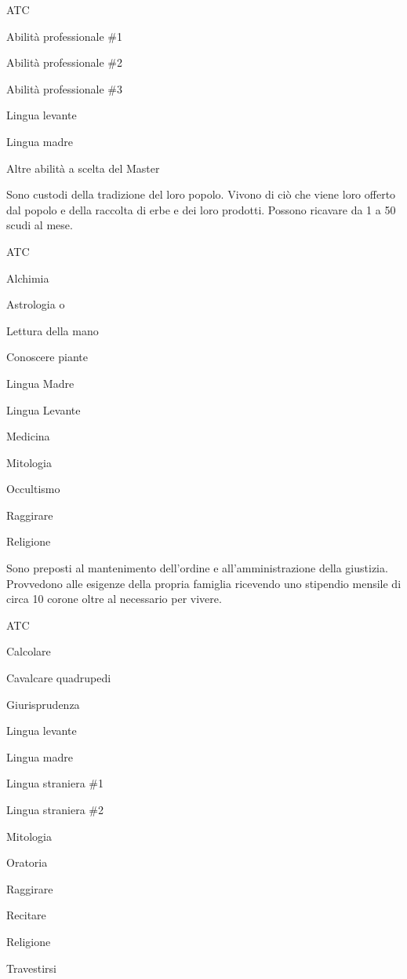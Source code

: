 \begin{abilist}
\item ATC
\item Abilit\`a professionale \#1
\item Abilit\`a professionale \#2
\item Abilit\`a professionale \#3
\item Lingua levante
\item Lingua madre
\item Altre abilit\`a a scelta del Master
\end{abilist}


Sono custodi della tradizione del loro popolo. Vivono di ci\`o che
viene loro offerto dal popolo e della raccolta di erbe e dei loro
prodotti. Possono ricavare da 1 a 50 scudi al mese.

\begin{abilist}
\item ATC
\item Alchimia
\item Astrologia o
\item Lettura della mano
\item Conoscere piante
\item Lingua Madre
\item Lingua Levante
\item Medicina
\item Mitologia
\item Occultismo
\item Raggirare
\item Religione
\end{abilist}


Sono preposti al mantenimento dell'ordine e all'amministrazione della giustizia.
Provvedono alle esigenze della propria famiglia ricevendo uno stipendio mensile di
circa 10 corone oltre al necessario per vivere.

\begin{abilist}
\item ATC
\item Calcolare
\item Cavalcare quadrupedi
\item Giurisprudenza
\item Lingua levante
\item Lingua madre
\item Lingua straniera \#1
\item Lingua straniera \#2
\item Mitologia
\item Oratoria
\item Raggirare
\item Recitare
\item Religione
\item Travestirsi
\end{abilist}


